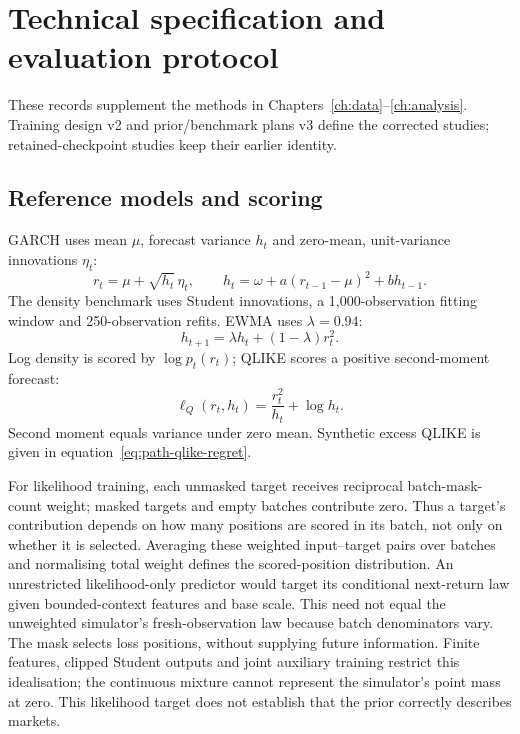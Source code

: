 \chapter{Technical specification and evaluation protocol}
\label{app:technical}
\label{app:forecast-details}
\label{app:closure_protocol}

These records supplement the methods in Chapters~\ref{ch:data}--\ref{ch:analysis}. Training design v2 and prior/benchmark plans v3 define the corrected studies; retained-checkpoint studies keep their earlier identity.

\section{Reference models and scoring}
\label{sec:appendix-reference-models}

GARCH uses mean $\mu$, forecast variance $h_t$ and zero-mean, unit-variance innovations $\eta_t$:
\begin{equation}
 r_t=\mu+\sqrt{h_t}\,\eta_t,\qquad
 h_t=\omega+a(r_{t-1}-\mu)^2+b h_{t-1}.
 \label{eq:appendix-garch}
\end{equation}
The density benchmark uses Student innovations, a 1,000-observation fitting window and 250-observation refits. EWMA uses $\lambda=0.94$:
\begin{equation}
 h_{t+1}=\lambda h_t+(1-\lambda)r_t^2.
 \label{eq:appendix-ewma}
\end{equation}
Log density is scored by $\log p_t(r_t)$; QLIKE scores a positive second-moment forecast:
\begin{equation}
 \ell_Q(r_t,h_t)=\frac{r_t^2}{h_t}+\log h_t.
 \label{eq:appendix-qlike}
\end{equation}
Second moment equals variance under zero mean. Synthetic excess QLIKE is given in equation~\eqref{eq:path-qlike-regret}.

For likelihood training, each unmasked target receives reciprocal batch-mask-count weight; masked targets and empty batches contribute zero. Thus a target's contribution depends on how many positions are scored in its batch, not only on whether it is selected. Averaging these weighted input--target pairs over batches and normalising total weight defines the scored-position distribution. An unrestricted likelihood-only predictor would target its conditional next-return law given bounded-context features and base scale. This need not equal the unweighted simulator's fresh-observation law because batch denominators vary. The mask selects loss positions, without supplying future information. Finite features, clipped Student outputs and joint auxiliary training restrict this idealisation; the continuous mixture cannot represent the simulator's point mass at zero. This likelihood target does not establish that the prior correctly describes markets.

